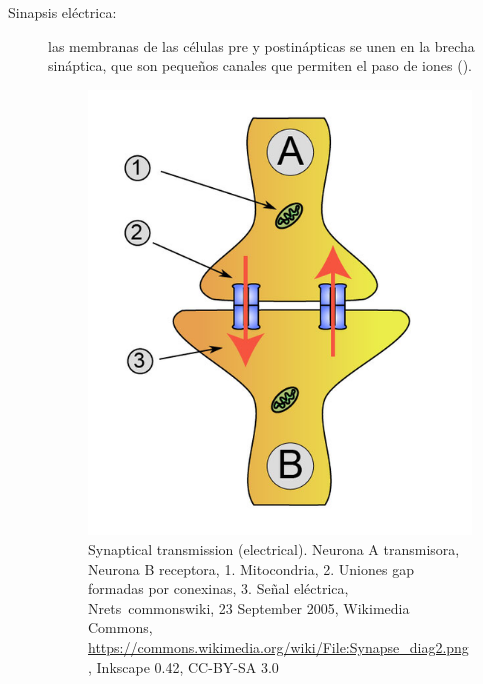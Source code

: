 \begin{description}
 \item [Sinapsis eléctrica:] las membranas de las células pre y postinápticas se unen en la brecha sináptica, que son pequeños canales que permiten el paso de iones ().



\begin{figure}[h]
 \centering
 \includegraphics[scale=0.2]{../Figuras/sinapsisElectrica.png}
 \caption{Synaptical transmission (electrical). Neurona A transmisora, Neurona B receptora, 1. Mitocondria, 2. Uniones gap formadas por conexinas, 3. Señal eléctrica, Nrets~commonswiki, 23 September 2005, Wikimedia Commons, \url{https://commons.wikimedia.org/wiki/File:Synapse_diag2.png}, Inkscape 0.42, CC-BY-SA 3.0}
 \label{fig:sinapsisN}
\end{figure}
 

\end{description}
